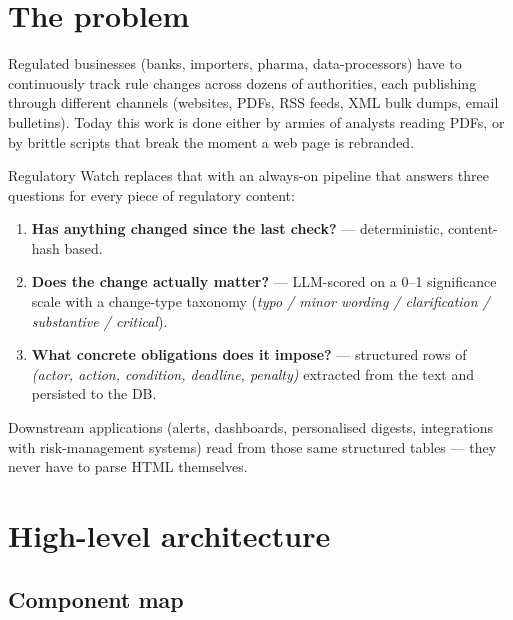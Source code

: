 \documentclass[11pt,a4paper]{article}
\begin{document}
\tableofcontents
\newpage

\section{The problem}

Regulated businesses (banks, importers, pharma, data-processors) have
to continuously track rule changes across dozens of authorities, each
publishing through different channels (websites, PDFs, RSS feeds, XML
bulk dumps, email bulletins). Today this work is done either by
armies of analysts reading PDFs, or by brittle scripts that break the
moment a web page is rebranded.

Regulatory Watch replaces that with an always-on pipeline that
answers three questions for every piece of regulatory content:

\begin{enumerate}[leftmargin=1.4em,itemsep=2pt]
  \item \textbf{Has anything changed since the last check?} ---{}
        deterministic, content-hash based.
  \item \textbf{Does the change actually matter?} ---{}
        LLM-scored on a 0--1 significance scale with a change-type
        taxonomy (\emph{typo / minor wording / clarification /
        substantive / critical}).
  \item \textbf{What concrete obligations does it impose?} ---{}
        structured rows of \emph{(actor, action, condition, deadline,
        penalty)} extracted from the text and persisted to the DB.
\end{enumerate}

Downstream applications (alerts, dashboards, personalised digests,
integrations with risk-management systems) read from those same
structured tables ---{} they never have to parse HTML themselves.

\section{High-level architecture}

\subsection{Component map}
\end{document}
